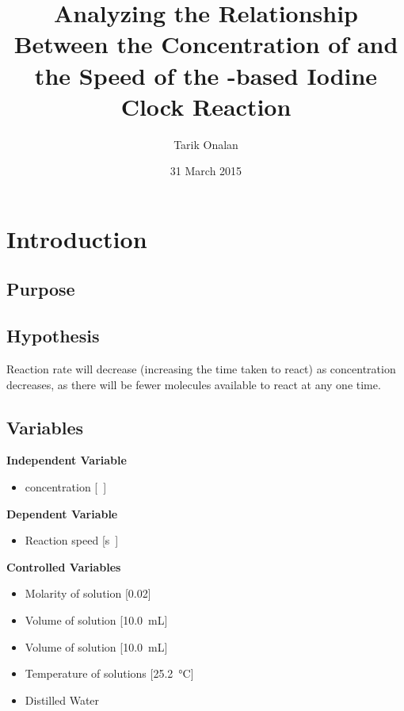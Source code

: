 \documentclass[a4paper]{article}
\title{Analyzing the Relationship Between the Concentration of \ce{KIO3} and the
Speed of the \ce{NaHSO3}-based Iodine Clock Reaction}
\date{31 March 2015}
\author{Tarik Onalan}
\begin{document}
    \maketitle
    \section{Introduction}
        \subsection{Purpose}
        \subsection{Hypothesis}
            Reaction rate will decrease (increasing the time taken to react) as 
            concentration decreases, as there will be fewer  molecules available
            to react at any one time.
        \subsection{Variables}
            \textbf{Independent Variable}
            \begin{itemize}
                \item {} concentration [\si\Molar]
            \end{itemize}
            \textbf{Dependent Variable}
            \begin{itemize}
                \item Reaction speed [\si\s]
            \end{itemize}
            \textbf{Controlled Variables}
            \begin{itemize}
                \item Molarity of  solution [\SI{0.02}{\Molar}]
                \item Volume of  solution [\SI{10.0}{\mL}]
                \item Volume of  solution [\SI{10.0}{\mL}]
                \item Temperature of solutions [\SI{25.2}{\celsius}]
                \item Distilled Water
            \end{itemize}
\end{document}
